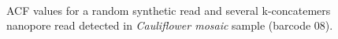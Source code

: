 \begin{figure}[!ht]
~

\caption{ACF values for a random synthetic read and several k-concatemers nanopore read detected in \emph{Cauliflower mosaic} sample (barcode 08).}
\label{supp_fig:concat_acf_dna}
\end{figure}
